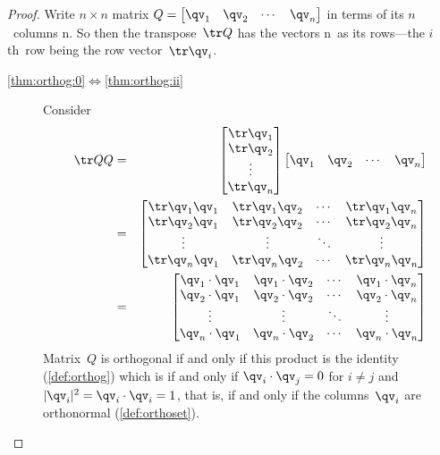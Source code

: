\begin{proof} 
Write \(n\times n\) matrix \(Q=\begin{bmatrix} \qv_1&\qv_2&\cdots&\qv_n \end{bmatrix}\) in terms of its \(n\)~columns \hlist\qv n.
So then the transpose~\(\tr Q\) has the vectors \hlist\qv n\ as its rows---the \(i\)th~row being the row vector~\(\tr\qv_i\).
\begin{description}
\item[\ref{thm:orthog:0}$\iff$\ref{thm:orthog:ii}]   Consider
\begin{eqnarray*}
\tr QQ
&=&\begin{bmatrix} \tr\qv_1\\\tr\qv_2\\\vdots\\\tr\qv_n \end{bmatrix}
\begin{bmatrix} \qv_1&\qv_2&\cdots&\qv_n \end{bmatrix}
\\&=&\begin{bmatrix} \tr\qv_1\qv_1&\tr\qv_1\qv_2&\cdots&\tr\qv_1\qv_n 
\\ \tr\qv_2\qv_1&\tr\qv_2\qv_2&\cdots&\tr\qv_2\qv_n 
\\\vdots&\vdots&\ddots&\vdots
\\ \tr\qv_n\qv_1&\tr\qv_n\qv_2&\cdots&\tr\qv_n\qv_n \end{bmatrix}
\\&=&\begin{bmatrix} \qv_1\cdot\qv_1&\qv_1\cdot\qv_2&\cdots&\qv_1\cdot\qv_n 
\\ \qv_2\cdot\qv_1&\qv_2\cdot\qv_2&\cdots&\qv_2\cdot\qv_n 
\\\vdots&\vdots&\ddots&\vdots
\\ \qv_n\cdot\qv_1&\qv_n\cdot\qv_2&\cdots&\qv_n\cdot\qv_n \end{bmatrix}
\end{eqnarray*}
Matrix~\(Q\) is orthogonal if and only if this product is the identity  (\cref{def:orthog}) which is if and only if \(\qv_i\cdot\qv_j=0\) for \(i\neq j\) and \(|\qv_i|^2=\qv_i\cdot\qv_i=1\), that is, if and only if the columns~\(\qv_i\) are orthonormal (\cref{def:orthoset}).


\end{description}
\end{proof}

